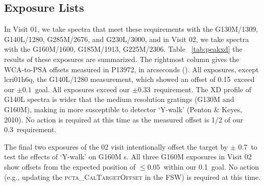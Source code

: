 \subsection{Exposure Lists}\label{subsec:elists}

In Visit 01, we take spectra that meet these requirements with the G130M/1309, G140L/1280, G285M/2676, and G230L/3000, and in Visit 02,
we take spectra with the G160M/1600, G185M/1913, G225M/2306. Table ~\ref{tab:peakxd} the results of these exposures are summarized.
The rightmost column gives the WCA-to-PSA offsets measured in P13972, in arcseconds (\arcsec).
All exposures, except {\sf lcri01h6q}, the G140L/1280 measurement, which showed an offset of 0.15\arcsec\ exceed our $\pm 0.1$\arcsec\ goal.
All exposures exceed our $\pm 0.33$\arcsec\ requirement. The XD profile of G140L spectra is wider that the medium
resolution gratings (G130M and G160M), making in more susceptible to detector `Y-walk' (Penton \& Keyes, 2010).
No action is required at this time as the measured offset is 1/2 of our 0.3\arcsec\ requirement.

The final two exposures of the 02 visit intentionally offset the target by $\pm$ 0.7\arcsec\ to test the effects
of `Y-walk' on G160M s. All three G160M exposures in Visit 02 show offsets from the expected position
of $\le 0.05$\arcsec\ within our 0.1\arcsec\ goal. No action (e.g., updating the \textsc{pcta\_CalTargetOffset} in the FSW)
is required at this time.



